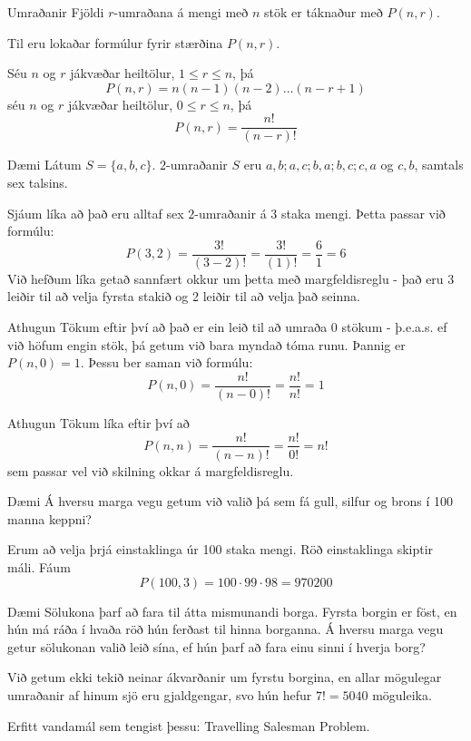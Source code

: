 \documentclass{beamer}
\begin{document}
\begin{frame}{Umraðanir}
Fjöldi $r$-umraðana á mengi með $n$ stök er táknaður með $P(n, r)$.

Til eru lokaðar formúlur fyrir stærðina $P(n,r)$. 

Séu $n$ og $r$ jákvæðar heiltölur, $1 \leq r \leq n$, þá
\[
 P (n, r) = n(n - 1)(n - 2) \ldots (n - r + 1)
\]
séu $n$ og $r$ jákvæðar heiltölur, $0 \leq r \leq n$, þá
\[
 P(n,r) = \frac{n!}{(n-r)!}
\]
\end{frame}

\begin{frame}{Dæmi}
Látum $S = \{a, b, c\}$. $2$-umraðanir $S$ eru $a, b; a, c; b, a;b, c; c, a$ og $c, b$, samtals sex talsins.

Sjáum líka að það eru alltaf sex $2$-umraðanir á 3 staka mengi. Þetta passar við formúlu:
\[
 P(3,2) = \frac{3!}{(3-2)!} = \frac{3!}{(1)!} = \frac{6}{1} = 6
\]
Við hefðum líka getað sannfært okkur um þetta með margfeldisreglu - það eru 3 leiðir til að velja fyrsta stakið og 2 leiðir til að velja það seinna.
\end{frame}

\begin{frame}{Athugun}
Tökum eftir því að það er ein leið til að umraða 0 stökum - þ.e.a.s. ef við höfum engin stök, þá getum við bara myndað tóma runu. Þannig er $P(n,0) = 1$. Þessu ber saman við formúlu:
\[
 P(n,0) = \frac{n!}{(n-0)!} = \frac{n!}{n!} = 1
\]
\end{frame}

\begin{frame}{Athugun}
Tökum líka eftir því að 
\[
 P(n,n) = \frac{n!}{(n-n)!} = \frac{n!}{0!} = n!
\]
sem passar vel við skilning okkar á margfeldisreglu.
\end{frame}

\begin{frame}{Dæmi}
Á hversu marga vegu getum við valið þá sem fá gull, silfur og brons í 100 manna keppni? \pause

Erum að velja þrjá einstaklinga úr 100 staka mengi. Röð einstaklinga skiptir máli. Fáum
\[
 P(100,3) = 100 \cdot 99 \cdot 98 = 970200
\]
\end{frame}

\begin{frame}{Dæmi}
Sölukona þarf að fara til átta mismunandi borga. Fyrsta borgin er föst, en hún má ráða í hvaða röð hún ferðast til hinna borganna. Á hversu marga vegu getur sölukonan valið leið sína, ef hún þarf að fara einu sinni í hverja borg? \pause

Við getum ekki tekið neinar ákvarðanir um fyrstu borgina, en allar mögulegar umraðanir af hinum sjö eru gjaldgengar, svo hún hefur $7! = 5040$ möguleika.

Erfitt vandamál sem tengist þessu: Travelling Salesman Problem.
\end{frame}
\end{document}
